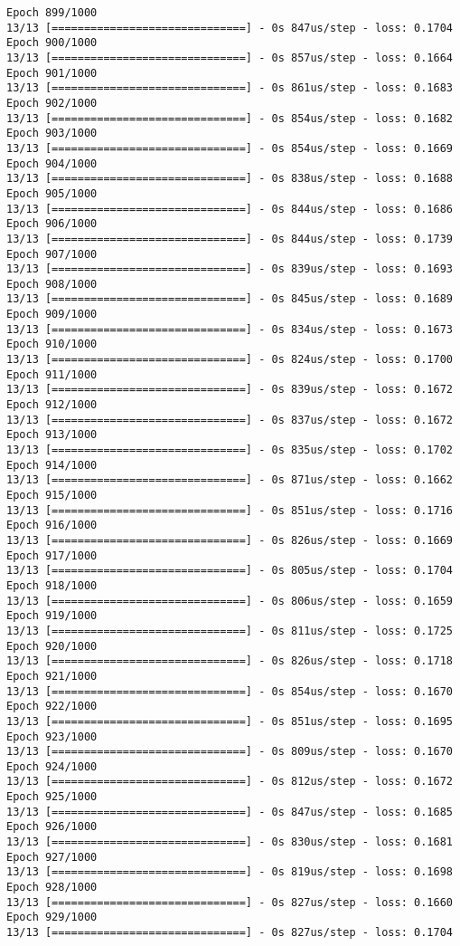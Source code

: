 \documentclass[11pt]{article}
\begin{document}
\begin{Verbatim}[commandchars=\\\{\}]
Epoch 899/1000
13/13 [==============================] - 0s 847us/step - loss: 0.1704
Epoch 900/1000
13/13 [==============================] - 0s 857us/step - loss: 0.1664
Epoch 901/1000
13/13 [==============================] - 0s 861us/step - loss: 0.1683
Epoch 902/1000
13/13 [==============================] - 0s 854us/step - loss: 0.1682
Epoch 903/1000
13/13 [==============================] - 0s 854us/step - loss: 0.1669
Epoch 904/1000
13/13 [==============================] - 0s 838us/step - loss: 0.1688
Epoch 905/1000
13/13 [==============================] - 0s 844us/step - loss: 0.1686
Epoch 906/1000
13/13 [==============================] - 0s 844us/step - loss: 0.1739
Epoch 907/1000
13/13 [==============================] - 0s 839us/step - loss: 0.1693
Epoch 908/1000
13/13 [==============================] - 0s 845us/step - loss: 0.1689
Epoch 909/1000
13/13 [==============================] - 0s 834us/step - loss: 0.1673
Epoch 910/1000
13/13 [==============================] - 0s 824us/step - loss: 0.1700
Epoch 911/1000
13/13 [==============================] - 0s 839us/step - loss: 0.1672
Epoch 912/1000
13/13 [==============================] - 0s 837us/step - loss: 0.1672
Epoch 913/1000
13/13 [==============================] - 0s 835us/step - loss: 0.1702
Epoch 914/1000
13/13 [==============================] - 0s 871us/step - loss: 0.1662
Epoch 915/1000
13/13 [==============================] - 0s 851us/step - loss: 0.1716
Epoch 916/1000
13/13 [==============================] - 0s 826us/step - loss: 0.1669
Epoch 917/1000
13/13 [==============================] - 0s 805us/step - loss: 0.1704
Epoch 918/1000
13/13 [==============================] - 0s 806us/step - loss: 0.1659
Epoch 919/1000
13/13 [==============================] - 0s 811us/step - loss: 0.1725
Epoch 920/1000
13/13 [==============================] - 0s 826us/step - loss: 0.1718
Epoch 921/1000
13/13 [==============================] - 0s 854us/step - loss: 0.1670
Epoch 922/1000
13/13 [==============================] - 0s 851us/step - loss: 0.1695
Epoch 923/1000
13/13 [==============================] - 0s 809us/step - loss: 0.1670
Epoch 924/1000
13/13 [==============================] - 0s 812us/step - loss: 0.1672
Epoch 925/1000
13/13 [==============================] - 0s 847us/step - loss: 0.1685
Epoch 926/1000
13/13 [==============================] - 0s 830us/step - loss: 0.1681
Epoch 927/1000
13/13 [==============================] - 0s 819us/step - loss: 0.1698
Epoch 928/1000
13/13 [==============================] - 0s 827us/step - loss: 0.1660
Epoch 929/1000
13/13 [==============================] - 0s 827us/step - loss: 0.1704

\end{Verbatim}
\end{document}
